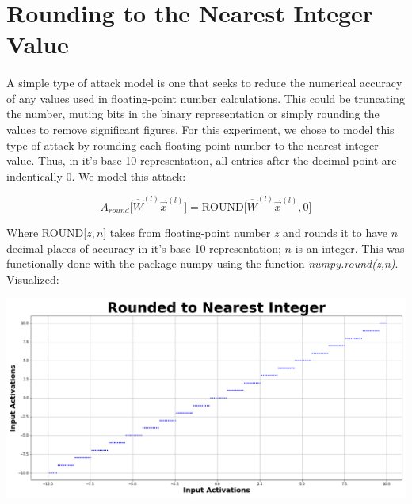 \documentclass[12pt,letterpaper]{article}
\begin{document}

\section*{Rounding to the Nearest Integer Value}

\paragraph*{}A simple type of attack model is one that seeks to reduce the numerical accuracy of any values used in floating-point number calculations.  This could be truncating the number, muting bits in the binary representation or simply rounding the values to remove significant figures. For this experiment, we chose to model this type of attack by rounding each floating-point number to the nearest integer value. Thus, in it's base-10 representation, all entries after the decimal point are indentically $0$. We model this attack:

\begin{equation}
\label{round attack}
A_{round} \big[ \hat{W}^{(l)} \vec{x}^{(l)} \big] = \text{ROUND} \big[ \hat{W}^{(l)} \vec{x}^{(l)} ,0 \big]
\end{equation}

Where ROUND[$z,n$] takes from floating-point number $z$ and rounds it to have $n$ decimal places of accuracy in it's base-10 representation; $n$ is an integer. This was functionally done with the package numpy using the function \textit{numpy.round(z,n)}. Visualized:
\begin{center}
\includegraphics[scale=0.3]{Rounded_to_Nearest_Integer}
\end{center}

\end{document}
